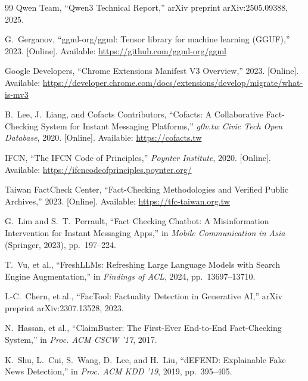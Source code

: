 \documentclass[twoside]{llncs}
\begin{document}
\begin{thebibliography}{99}
Qwen Team, ``Qwen3 Technical Report,'' arXiv preprint arXiv:2505.09388, 2025.

G.~Gerganov, ``ggml-org/ggml: Tensor library for machine learning (GGUF),'' 2023. [Online]. Available: \url{https://github.com/ggml-org/ggml}

Google Developers, ``Chrome Extensions Manifest V3 Overview,'' 2023. [Online]. Available: \url{https://developer.chrome.com/docs/extensions/develop/migrate/what-is-mv3}

B.~Lee, J.~Liang, and Cofacts Contributors, ``Cofacts: A Collaborative Fact-Checking System for Instant Messaging Platforms,'' \emph{g0v.tw Civic Tech Open Database}, 2020. [Online]. Available: \url{https://cofacts.tw}

IFCN, ``The IFCN Code of Principles,'' \emph{Poynter Institute}, 2020. [Online]. Available: \url{https://ifcncodeofprinciples.poynter.org/}

Taiwan FactCheck Center, ``Fact-Checking Methodologies and Verified Public Archives,'' 2023. [Online]. Available: \url{https://tfc-taiwan.org.tw}

G.~Lim and S.~T.~Perrault, ``Fact Checking Chatbot: A Misinformation Intervention for Instant Messaging Apps,'' in \emph{Mobile Communication in Asia} (Springer, 2023), pp.~197--224.

T.~Vu, et al., ``FreshLLMs: Refreshing Large Language Models with Search Engine Augmentation,'' in \emph{Findings of ACL}, 2024, pp.~13697--13710.

I.-C.~Chern, et al., ``FacTool: Factuality Detection in Generative AI,'' arXiv preprint arXiv:2307.13528, 2023.

N.~Hassan, et al., ``ClaimBuster: The First-Ever End-to-End Fact-Checking System,'' in \emph{Proc. ACM CSCW '17}, 2017.

K.~Shu, L.~Cui, S.~Wang, D.~Lee, and H.~Liu, ``dEFEND: Explainable Fake News Detection,'' in \emph{Proc. ACM KDD '19}, 2019, pp.~395--405.

\end{thebibliography}
\end{document}
